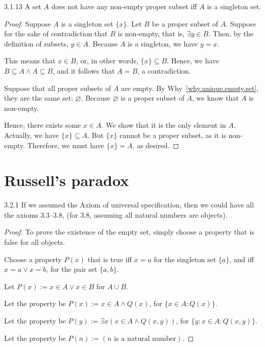 \begin{exercise}{3.1.13}
	A set $A$ does not have any non-empty proper subset iff $A$ is a singleton set.
\end{exercise}
\begin{proof}
	 Suppose $A$ is a singleton set $\{x\}$. Let $B$ be a proper subset of $A$. Suppose for the sake of contradiction that $B$ is non-empty, that is, $\exists y \in B$. Then, by the definition of subsets, $y \in A$. Because $A$ is a singleton, we have $y = x$.
	
	This means that $x \in B$, or, in other words, $\{x\} \subseteq B$. Hence, we have $B \subseteq A \wedge A \subseteq B$, and it follows that $A = B$, a contradiction.
	
	 Suppose that all proper subsets of $A$ are empty. By Why~\ref{why.unique.empty.set}, they are the same set: $\varnothing$. Because $\varnothing$ is a proper subset of $A$, we know that $A$ is non-empty.
	
	Hence, there exists some $x \in A$. We show that it is the only element in $A$. Actually, we have $\{x\} \subseteq A$. But $\{x\}$ cannot be a proper subset, as it is non-empty. Therefore, we must have $\{x\} = A$, as desired.
\end{proof}

\section{Russell's paradox}

\begin{exercise}{3.2.1}
	If we assumed the Axiom of universal specification, then we could have all the axioms 3.3--3.8, (for 3.8, assuming all natural numbers are objects).
\end{exercise}
\begin{proof}
 To prove the existence of the empty set, simply choose a property that is false for all objects.

 Choose a property $P(x)$ that is true iff $x = a$ for the singleton set $\{a\}$, and iff $x = a \vee x = b$, for the pair set $\{a,b\}$.

 Let $P(x) := x \in A \vee x \in B$ for $A \cup B$.

 Let the property be $P(x):= x \in A \wedge Q(x)$, for $\{x \in A : Q(x)\}$.

 Let the property be $P(y):= \exists x(x \in A \wedge Q(x,y))$, for $\{y: x \in A: Q(x,y)\}$.

 Let the property be $P(n):= (n \text{ is a natural number})$.
\end{proof}

